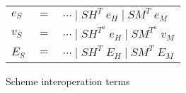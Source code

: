 \begin{figure}
\begin{center}
\begin{tabular}{lcl}
$e_{S}$ & $=$ & $\cdots\;\vert\;SH^{T}\;e_{H}\;\vert\;SM^{T}\;e_{M}$ \\
$v_{S}$ & $=$ & $\cdots\;\vert\;SH^{T^{a}}\;e_{H}\;\vert\;SM^{T^{a}}\;v_{M}$ \\
$E_{S}$ & $=$ & $\cdots\;\vert\;SH^{T}\;E_{H}\;\vert\;SM^{T}\;E_{M}$
\end{tabular}
\end{center}
\caption{Scheme interoperation terms}
\label{fig:sit}
\end{figure}